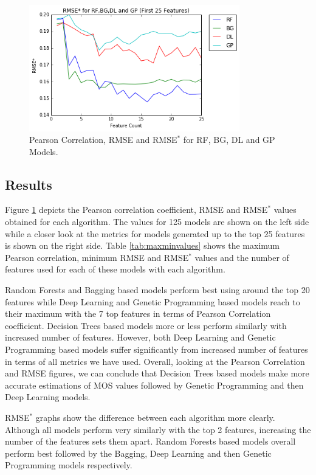 \documentclass[journal]{IEEEtran}
\begin{document}
\begin{figure}[ht!]
\includegraphics[width=3.6in]{./epsilonrmsezoom.png}
\caption{Pearson Correlation, RMSE and RMSE$^*$ for RF, BG, DL and GP Models.}
\label{fig:all}
\end{figure}

\subsection{Results}

Figure \ref{fig:all} depicts the Pearson correlation coefficient, RMSE and RMSE$^*$ values obtained for each algorithm. The values for 125 models are shown on the left side while a closer look at the metrics for models generated up to the top 25 features is shown on the right side. Table \ref{tab:maxminvalues} shows the maximum Pearson correlation, minimum RMSE and RMSE$^*$ values and the number of features used for each of these models with each algorithm.

Random Forests and Bagging based models perform best using around the top 20 features while Deep Learning and Genetic Programming based models reach to their maximum with the 7 top features in terms of Pearson Correlation coefficient. Decision Trees based models more or less perform similarly with increased number of features. However, both Deep Learning and Genetic Programming based models suffer significantly from increased number of features in terms of all metrics we have used. Overall, looking at the Pearson Correlation and RMSE figures, we can conclude that Decision Trees based models make more accurate estimations of MOS values followed by Genetic Programming and then Deep Learning models. 

RMSE$^*$ graphs show the difference between each algorithm more clearly. Although all models perform very similarly with the top 2 features, increasing the number of the features sets them apart. Random Forests based models overall perform best followed by the Bagging, Deep Learning and then Genetic Programming models respectively.
\end{document}
